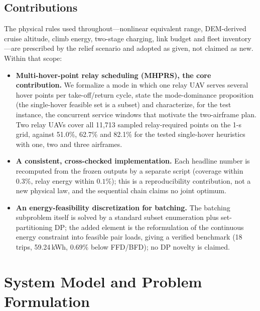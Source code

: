 \documentclass[journal]{IEEEtran}
\begin{document}
\subsection{Contributions}
The physical rules used throughout---nonlinear equivalent range, DEM-derived
cruise altitude, climb energy, two-stage charging, link budget and fleet
inventory---are prescribed by the relief scenario and adopted as given, not
claimed as new. Within that scope:
\begin{itemize}
\item \textbf{Multi-hover-point relay scheduling (MHPRS), the core
contribution.} We formalize a mode in which one relay UAV serves several hover
points per take-off/return cycle, state the mode-dominance proposition (the
single-hover feasible set is a subset) and characterize, for the test instance,
the concurrent service windows that motivate the two-airframe plan. Two relay
UAVs cover all
11,713 sampled relay-required points on the 1-s grid, against 51.0\%, 62.7\% and
82.1\% for the tested single-hover heuristics with one, two and three airframes.
\item \textbf{A consistent, cross-checked implementation.} Each
headline number is recomputed from the frozen outputs by a separate script
(coverage within $0.3\%$, relay energy within $0.1\%$); this is a reproducibility
contribution, not a new physical law, and the sequential chain claims no joint
optimum.
\item \textbf{An energy-feasibility discretization for batching.} The batching
subproblem itself is solved by a standard subset enumeration plus
set-partitioning DP; the added element is the reformulation of the continuous
energy constraint into feasible pair loads, giving a verified benchmark (18
trips, 59.24\,kWh, 0.69\% below FFD/BFD); no DP novelty is claimed.
\end{itemize}

\section{System Model and Problem Formulation}\label{sec:sys}
\end{document}
